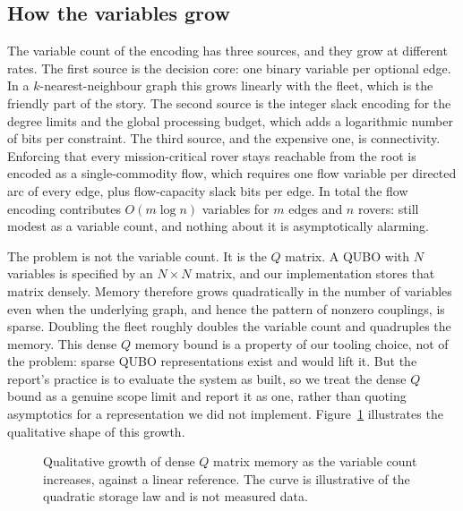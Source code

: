 \subsection{How the variables grow}
\label{sec:scaling-variables}

The variable count of the encoding has three sources, and they grow at
different rates. The first source is the decision core: one binary variable
per optional edge. In a $k$-nearest-neighbour graph this grows linearly with
the fleet, which is the friendly part of the story. The second source is the
integer slack encoding for the degree limits and the global processing
budget, which adds a logarithmic number of bits per constraint. The third
source, and the expensive one, is connectivity. Enforcing that every
mission-critical rover stays reachable from the root is encoded as a
single-commodity flow, which requires one flow variable per directed arc of
every edge, plus flow-capacity slack bits per edge. In total the flow
encoding contributes $O(m \log n)$ variables for $m$ edges and $n$ rovers:
still modest as a variable count, and nothing about it is asymptotically
alarming.

The problem is not the variable count. It is the $Q$ matrix. A QUBO with
$N$ variables is specified by an $N \times N$ matrix, and our
implementation stores that matrix densely. Memory therefore grows
quadratically in the number of variables even when the underlying graph,
and hence the pattern of nonzero couplings, is sparse. Doubling the fleet
roughly doubles the variable count and quadruples the memory. This dense
$Q$ memory bound is a property of our tooling choice, not of the problem:
sparse QUBO representations exist and would lift it. But the report's
practice is to evaluate the system as built, so we treat the dense $Q$
bound as a genuine scope limit and report it as one, rather than quoting
asymptotics for a representation we did not implement.
Figure~\ref{fig:scaling-qmemory} illustrates the qualitative shape of this
growth.

\begin{figure}[t]
\centering
{}
\caption{Qualitative growth of dense $Q$ matrix memory as the variable count
increases, against a linear reference. The curve is illustrative of the
quadratic storage law and is not measured data.}
\label{fig:scaling-qmemory}
\end{figure}

